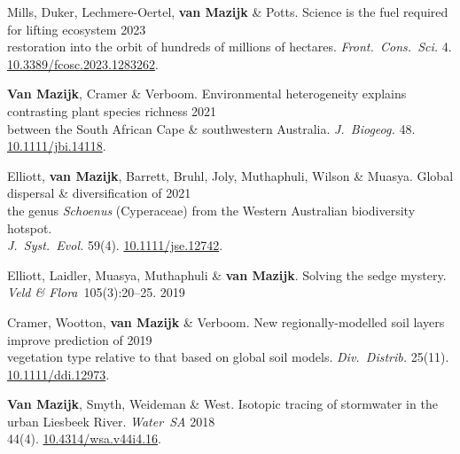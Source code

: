 Mills, Duker, Lechmere-Oertel, \textbf{van Mazijk} \& Potts.
Science is the fuel required for lifting ecosystem             \hfill 2023 \\
\hspace{2em} restoration into the orbit of hundreds of millions of hectares.
  \textit{Front.~Cons.~Sci.}
  4. \\
  \hspace{2em} \href{https://doi.org/10.3389/fcosc.2023.1283262}{10.3389/fcosc.2023.1283262}.

\textbf{Van Mazijk}, Cramer \& Verboom.
Environmental heterogeneity explains contrasting plant species richness
                                                                  \hfill 2021 \\
\hspace{2em}
  between the South African Cape \& southwestern Australia.
  \textit{J.~Biogeog.}
  48. \href{https://doi.org/10.1111/jbi.14118}{10.1111/jbi.14118}.

Elliott, \textbf{van Mazijk}, Barrett, Bruhl,
Joly, Muthaphuli, Wilson \& Muasya.
Global dispersal \& diversification of                            \hfill 2021 \\
\hspace{2em}
  the genus \textit{Schoenus} (Cyperaceae)
  from the Western Australian biodiversity hotspot.                           \\
\hspace{2em}
  \textit{J.~Syst.~Evol.}
  59(4).
  \href{https://doi.org/10.1111/jse.1274}{10.1111/jse.12742}.

Elliott, Laidler, Muasya, Muthaphuli \& \textbf{van Mazijk}.
Solving the sedge mystery.
\textit{Veld \& Flora}~105(3):20--25.                             \hfill 2019

Cramer, Wootton, \textbf{van Mazijk} \& Verboom.
New regionally-modelled soil layers improve prediction of         \hfill 2019 \\
\hspace{2em}
  vegetation type relative to that based on global soil models.
  \textit{Div.~Distrib.}
  25(11).                                                        
  \href{https://doi.org/10.1111/ddi.12973}{10.1111/ddi.12973}.

\textbf{Van Mazijk}, Smyth, Weideman \& West.
Isotopic tracing of stormwater in the urban Liesbeek River.
\textit{Water~SA}                                                 \hfill 2018 \\
\hspace{2em}
  44(4).
  \href{https://doi.org/10.4314/wsa.v44i4.16}{10.4314/wsa.v44i4.16}.
